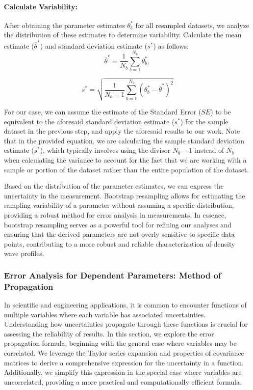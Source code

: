\documentclass{article}
\begin{document}
\paragraph{Calculate Variability:}
After obtaining the parameter estimates $\theta^{*}_{b}$ for all resampled datasets, we analyze the distribution of these estimates to determine variability. Calculate the mean estimate ($\bar{\theta}^{*}$) and standard deviation estimate ($s^{*}$) as follows\cite{Chernick2007BootstrapMA,davison_hinkley_1997,Efron1994AnIT}:
\begin{equation}
\bar{\theta}^{*} = \frac{1}{N_{b}}\sum_{b=1}^{N_{b}}\theta^{*}_{b},
\end{equation}

\begin{equation}
s^{*} = \sqrt{\frac{1}{N_{b}-1}\sum_{b=1}^{N_{b}}(\theta^{*}_{b} - \bar{\theta}^{*})^2}
\end{equation}

For our case, we can assume the estimate of the Standard Error ($SE$) to be equivalent to the aforesaid standard deviation estimate ($s^{*}$) for the sample dataset in the previous step, and apply the aforesaid results to our work. Note that in the provided equation, we are calculating the sample standard deviation estimate ($s^{*}$), which typically involves using the divisor $N_{b}-1$ instead of $N_{b}$ when calculating the variance to account for the fact that we are working with a sample or portion of the dataset rather than the entire population of the dataset.

Based on the distribution of the parameter estimates, we can express the uncertainty in the measurement. Bootstrap resampling allows for estimating the sampling variability of a parameter without assuming a specific distribution, providing a robust method for error analysis in measurements. In essence, bootstrap resampling serves as a powerful tool for refining our analyses and ensuring that the derived parameters are not overly sensitive to specific data points, contributing to a more robust and reliable characterization of density wave profiles.

\subsubsection{Error Analysis for Dependent Parameters: Method of Propagation}
In scientific and engineering applications, it is common to encounter functions of multiple variables where each variable has associated uncertainties. Understanding how uncertainties propagate through these functions is crucial for assessing the reliability of results. In this section, we explore the error propagation formula, beginning with the general case where variables may be correlated. We leverage the Taylor series expansion and properties of covariance matrices to derive a comprehensive expression for the uncertainty in a function. Additionally, we simplify this expression in the special case where variables are uncorrelated, providing a more practical and computationally efficient formula.
\end{document}
